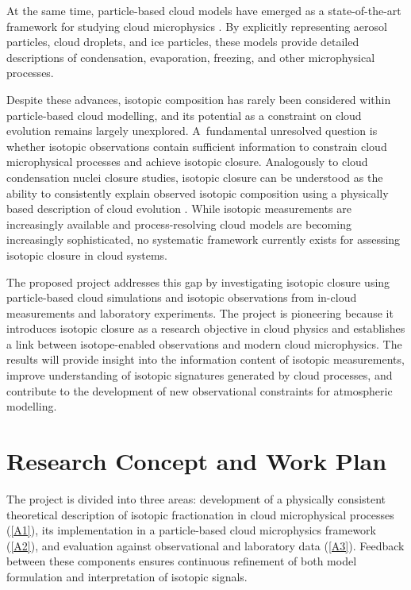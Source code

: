 \documentclass[12pt]{article}
\begin{document}
At the same time, particle-based cloud models have emerged 
as a state-of-the-art framework for studying cloud microphysics \parencite{2009_Shima_EtAl}.
By explicitly representing aerosol particles, cloud droplets,
and ice particles, these models provide detailed descriptions of condensation,
evaporation, freezing, and other microphysical processes.

Despite these advances, isotopic composition has rarely been 
considered within particle-based cloud modelling,
and its potential as a constraint on cloud evolution remains
largely unexplored.
A~fundamental unresolved question is whether isotopic observations
contain sufficient information to constrain cloud microphysical
processes and achieve isotopic closure.
Analogously to cloud condensation nuclei closure studies,
isotopic closure can be understood as the ability to consistently explain observed
isotopic composition using a physically based description of cloud evolution \parencite{2021_Knopf_EtAla}.
While isotopic measurements are increasingly available and
process-resolving cloud models are becoming increasingly sophisticated,
no systematic framework currently exists for assessing isotopic
closure in cloud systems.

The proposed project addresses this gap by investigating isotopic
closure using particle-based cloud simulations and isotopic observations
from in-cloud measurements and laboratory experiments.
The project is pioneering because it introduces isotopic closure
as a research objective in cloud physics and establishes
a link between isotope-enabled observations and modern cloud microphysics.
The results will provide insight into the information content
of isotopic measurements, improve understanding of isotopic signatures
generated by cloud processes, and contribute to the development
of new observational constraints for atmospheric modelling.

\section{Research Concept and Work Plan}
The project is divided into three areas: development of a physically
consistent theoretical description of isotopic fractionation in cloud microphysical
processes (\ref{A1}),
its implementation in a particle-based cloud microphysics framework (\ref{A2}),
and evaluation against observational and laboratory data (\ref{A3}).
Feedback between these components ensures continuous refinement
of both model formulation and interpretation of isotopic signals.
\end{document}

